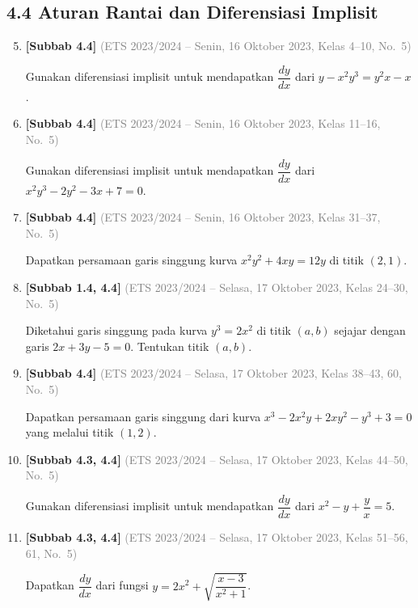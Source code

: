 \documentclass[10pt,openany,a4paper]{article}
\theoremstyle{definition}
\theoremstyle{definition}
\theoremstyle{plain}
\begin{document}
\subsection*{4.4 \quad Aturan Rantai dan Diferensiasi Implisit}
\begin{enumerate}
\setcounter{enumi}{4}
    \item \textbf{[Subbab 4.4]} {\footnotesize\textcolor{gray}{(ETS 2023/2024 -- Senin, 16 Oktober 2023, Kelas 4--10, No.~5)}}\par
    Gunakan diferensiasi implisit untuk mendapatkan $\dfrac{dy}{dx}$ dari $y-x^2y^3=y^2x-x$.

    \item \textbf{[Subbab 4.4]} {\footnotesize\textcolor{gray}{(ETS 2023/2024 -- Senin, 16 Oktober 2023, Kelas 11--16, No.~5)}}\par
    Gunakan diferensiasi implisit untuk mendapatkan $\dfrac{dy}{dx}$ dari $x^2y^3-2y^2-3x+7=0$.

    \item \textbf{[Subbab 4.4]} {\footnotesize\textcolor{gray}{(ETS 2023/2024 -- Senin, 16 Oktober 2023, Kelas 31--37, No.~5)}}\par
    Dapatkan persamaan garis singgung kurva $x^2y^2+4xy=12y$ di titik $(2,1)$.

    \item \textbf{[Subbab 1.4, 4.4]} {\footnotesize\textcolor{gray}{(ETS 2023/2024 -- Selasa, 17 Oktober 2023, Kelas 24--30, No.~5)}}\par
    Diketahui garis singgung pada kurva $y^3=2x^2$ di titik $(a,b)$ sejajar dengan garis $2x+3y-5=0$. Tentukan titik $(a,b)$.

    \item \textbf{[Subbab 4.4]} {\footnotesize\textcolor{gray}{(ETS 2023/2024 -- Selasa, 17 Oktober 2023, Kelas 38--43, 60, No.~5)}}\par
    Dapatkan persamaan garis singgung dari kurva $x^3-2x^2y+2xy^2-y^3+3=0$ yang melalui titik $(1,2)$.

    \item \textbf{[Subbab 4.3, 4.4]} {\footnotesize\textcolor{gray}{(ETS 2023/2024 -- Selasa, 17 Oktober 2023, Kelas 44--50, No.~5)}}\par
    Gunakan diferensiasi implisit untuk mendapatkan $\dfrac{dy}{dx}$ dari $x^2-y+\dfrac{y}{x}=5$.

    \item \textbf{[Subbab 4.3, 4.4]} {\footnotesize\textcolor{gray}{(ETS 2023/2024 -- Selasa, 17 Oktober 2023, Kelas 51--56, 61, No.~5)}}\par
    Dapatkan $\dfrac{dy}{dx}$ dari fungsi $y=2x^2+\sqrt{\dfrac{x-3}{x^2+1}}$.


\end{enumerate}
\end{document}
